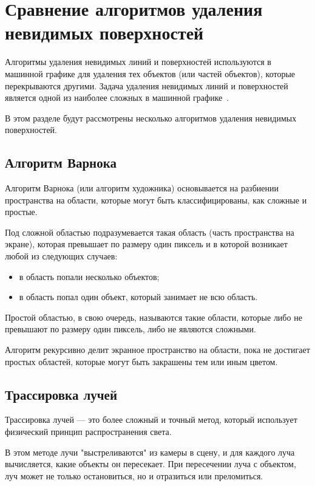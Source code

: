 \section{Сравнение алгоритмов удаления невидимых поверхностей}

Алгоритмы удаления невидимых линий и поверхностей используются в машинной графике для удаления тех объектов (или частей объектов), которые перекрываются другими. Задача удаления невидимых линий и поверхностей является одной из наиболее сложных в машинной графике~\cite{Rogers}.

В этом разделе будут рассмотрены несколько алгоритмов удаления невидимых поверхностей.

\subsection*{Алгоритм Варнока}

Алгоритм Варнока (или алгоритм художника) основывается на разбиении пространства на области, которые могут быть классифицированы, как сложные и простые.

Под сложной областью подразумевается такая область (часть пространства на экране), которая превышает по размеру один пиксель и в которой возникает любой из следующих случаев:
\begin{itemize}
    \item в область попали несколько объектов;
    \item в область попал один объект, который занимает не всю область.
\end{itemize}

Простой областью, в свою очередь, называются такие области, которые либо не превышают по размеру один пиксель, либо не являются сложными.

Алгоритм рекурсивно делит экранное пространство на области, пока не достигает простых областей, которые могут быть закрашены тем или иным цветом.

\subsection*{Трассировка лучей}

Трассировка лучей --- это более сложный и точный метод, который использует физический принцип распространения света. 

В этом методе лучи "выстреливаются" из камеры в сцену, и для каждого луча вычисляется, какие объекты он пересекает. При пересечении луча с объектом, луч может не только остановиться, но и отразиться или преломиться. 

